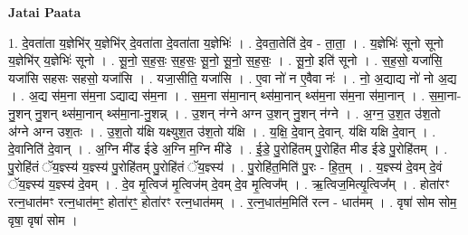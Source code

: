 \documentclass[17pt]{extarticle}
\begin{document}
\textbf{Jatai Paata} \newline

1. दे॒वता॑ता य॒ज्ञेभि॑र् य॒ज्ञेभि॑र् दे॒वता॑ता दे॒वता॑ता य॒ज्ञेभिः॑ । . दे॒वता॒तेति॑ दे॒व - ता॒ता॒ । . य॒ज्ञेभिः॑ सूनो सूनो य॒ज्ञेभि॑र् य॒ज्ञेभिः॑ सूनो । . सू॒नो॒ स॒ह॒सः॒ स॒ह॒सः॒ सू॒नो॒ सू॒नो॒ स॒ह॒सः॒ । . सू॒नो॒ इति॑ सूनो । . स॒ह॒सो॒ यजा॑सि॒ यजा॑सि सहसः सहसो॒ यजा॑सि । . यजा॒सीति॒ यजा॑सि । . ए॒वा नो॑ न ए॒वैवा नः॑ । . नो॒ अ॒द्याद्य नो॑ नो अ॒द्य । . अ॒द्य स॑म॒ना स॑म॒ना ऽद्याद्य स॑म॒ना । . स॒म॒ना स॑मा॒नान् थ्स॑मा॒नान् थ्स॑म॒ना स॑म॒ना स॑मा॒नान् । . स॒मा॒ना-नु॒शन् नु॒शन् थ्स॑मा॒नान् थ्स॑मा॒ना-नु॒शन्न् । . उ॒शन् न॑ग्ने अग्न उ॒शन् नु॒शन् न॑ग्ने । . अ॒ग्न॒ उ॒श॒त उ॑श॒तो अ॑ग्ने अग्न उश॒तः । . उ॒श॒तो य॑क्षि यक्ष्युश॒त उ॑श॒तो य॑क्षि । . य॒क्षि॒ दे॒वान् दे॒वान्. य॑क्षि यक्षि दे॒वान् । . दे॒वानिति॑ दे॒वान् । . अ॒ग्नि मी॑ड ईडे अ॒ग्नि म॒ग्नि मी॑डे । . ई॒डे॒ पु॒रोहि॑तम् पु॒रोहि॑त मीड ईडे पु॒रोहि॑तम् । . पु॒रोहि॑तं ॅय॒ज्ञ्स्य॑ य॒ज्ञ्स्य॑ पु॒रोहि॑तम् पु॒रोहि॑तं ॅय॒ज्ञ्स्य॑ । . पु॒रोहि॑त॒मिति॑ पु॒रः - हि॒त॒म् । . य॒ज्ञ्स्य॑ दे॒वम् दे॒वं ॅय॒ज्ञ्स्य॑ य॒ज्ञ्स्य॑ दे॒वम् । . दे॒व मृ॒त्विज॑ मृ॒त्विज॑म् दे॒वम् दे॒व मृ॒त्विज᳚म् । . ऋ॒त्विज॒मित्यृ॒त्विज᳚म् । . होता॑रꣳ रत्न॒धात॑मꣳ रत्न॒धात॑मꣳ॒॒ होता॑रꣳ॒॒ होता॑रꣳ रत्न॒धात॑मम् । . र॒त्न॒धात॑म॒मिति॑ रत्न - धात॑मम् । . वृषा॑ सोम सोम॒ वृषा॒ वृषा॑ सोम । \newline
\end{document}
